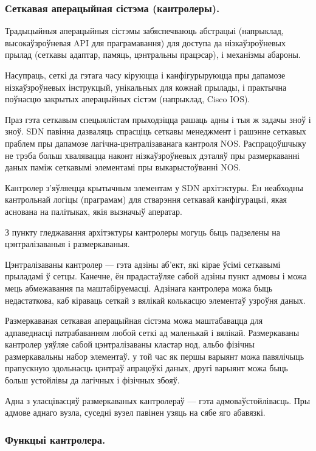 \subsubsection{Сеткавая аперацыйная сістэма (кантролеры).}

Традыцыйныя аперацыйныя сістэмы забяспечваюць абстрацыі (напрыклад, высокаўзроўневая API для праграмавання) для доступа да нізкаўзроўневых прылад (сеткавы адаптар, памяць, цэнтральны працэсар), і механізмы абароны.

Насупраць, сеткі да гэтага часу кіруюцца і канфігурыруюцца пры дапамозе нізкаўзроўневых
інструкцый, унікальных для кожнай прылады, і практычна поўнасцю закрытых аперацыйных
сістэм (напрыклад, Cisco IOS).

Праз гэта сеткавым спецыялістам прыходзіцца рашаць адны і тыя ж задачы зноў і зноў.
SDN павінна дазваляць спрасціць сеткавы менеджмент і рашэнне сеткавых праблем
пры дапамозе лагічна-цэнтралізаванага кантроля NOS. Распрацоўшчыку не трэба
больш хвалявацца наконт нізкаўзроўневых дэталяў пры размеркаванні
даных паміж сеткавымі элементамі пры выкарыстоўванні NOS.

Кантролер з'яўляецца крытычным элементам у SDN архітэктуры. Ён неабходны кантрольнай
логіцы (праграмам) для стварэння сеткавай канфігурацыі, якая аснована на палітыках,
якія вызначыў аператар.

З пункту гледжавання архітэктуры кантролеры могуць быць падзелены на цэнтралізаваныя
і размеркаваныя.

Цэнтралізаваны кантролер --- гэта адзіны аб'ект, які кірае ўсімі сеткавымі прыладамі
ў сетцы. Канечне, ён прадастаўляе сабой адзіны пункт адмовы і можа мець абмежавання
па маштабіруемасці. Адзінага кантролера можа быць недастаткова, каб кіраваць
сеткай з вялікай колькасцю элементаў узроўня даных.

Размеркаваная сеткавая аперацыйная сістэма можа маштабавацца для адпаведнасці
патрабаванням любой сеткі ад маленькай і вялікай. Размеркаваны кантролер
уяўляе сабой цэнтралізаваны кластар нод, альбо фізічны размеркавальны набор элементаў.
у той час як першы варыянт можа павялічыць прапускную здольнасць цэнтраў апрацоўкі даных, другі варыянт можа быць больш устойлівы да лагічных і фізічных збояў.

Адна з уласцівасцяў размеркаваных кантролераў --- гэта адмоваўстойлівасць.
Пры адмове аднаго вузла, суседні вузел павінен узяць на сябе яго абавязкі.

\subsubsection{Функцыі кантролера.}

